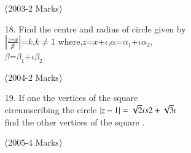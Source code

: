 \documentclass[journal,12pt,twocolumn]{IEEEtran}
\theoremstyle{remark}
\begin{document}
\begin{enumerate}
   \hfill (2003-2 Marks)\\
      
      
\item[18.] Find the centre and radius  of circle given by\\
    $\left\vert\frac{z-\alpha} \beta\right\vert$=$k$,$k\not=1$ 
where,$z$=$x$+$\iota$,$\alpha$=$\alpha_1$+$\iota\alpha_2$, \\
    $\beta$=$\beta_1$+$\iota\beta_2$. 
    
    \hfill(2004-2 Marks) \\
      
\item[19.] If one the vertices of the square \\
circumscribing the circle $\left\vert z-1\right\vert = \sqrt{2} is 2 +\sqrt{3} \iota $ \\
find the other vertices of the square .

\hfill (2005-4 Marks) \\

\end{enumerate}
\end{document}
